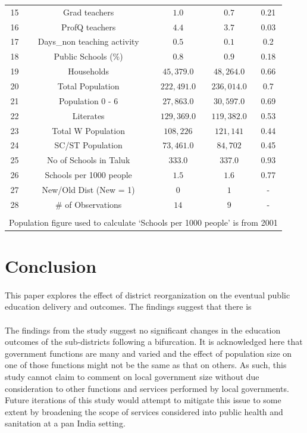 \documentclass[12pt, a4paper]{article}
\begin{document}
\begin{table}[!htbp]
\begin{tabular}{@{\extracolsep{5pt}} ccccc}
		15 & Grad teachers & $1.0$ & $0.7$ & 0.21 \\ 
		16 & ProfQ teachers & $4.4$ & $3.7$ & 0.03 \\ 
		17 & Days\_non teaching activity & $0.5$ & $0.1$ & 0.2 \\ 
		18 & Public Schools (\%) & $0.8$ & $0.9$ & 0.18 \\ 
		19 & Households & $45,379.0$ & $48,264.0$ & 0.66 \\ 
		20 & Total Population & $222,491.0$ & $236,014.0$ & 0.7 \\ 
		21 & Population 0 - 6 & $27,863.0$ & $30,597.0$ & 0.69 \\ 
		22 & Literates & $129,369.0$ & $119,382.0$ & 0.53 \\ 
		23 & Total W Population & $108,226$ & $121,141$ & 0.44 \\ 
		24 & SC/ST Population & $73,461.0$ & $84,702$ & 0.45 \\ 
		25 & No of Schools in Taluk & $333.0$ & $337.0$ & 0.93 \\ 
		26 & Schools per 1000 people & $1.5$ & $1.6$ & 0.77 \\ 
		27 & New/Old Dist (New = 1) & $0$ & $1$ & - \\ 
		28 & \# of Observations & $14$ & $9$ & - \\ 
		\hline \\[-1.8ex] 
		\multicolumn{5}{l}{Population figure used to calculate `Schools per 1000 people' is from 2001} \\ 
	\end{tabular} 
\end{table}

\section*{Conclusion}
\paragraph{} This paper explores the effect of district reorganization on the eventual public education delivery and outcomes. The findings suggest that there is 

\paragraph{} The findings from the study suggest no significant changes in the education outcomes of the sub-districts following a bifurcation. It is acknowledged here that government functions are many and varied and the effect of population size on one of those functions might not be the same as that on others. As such, this study cannot claim to comment on local government size without due consideration to other functions and services performed by local governments. Future iterations of this study would attempt to mitigate this issue to some extent by broadening the scope of services considered into public health and sanitation at a pan India setting.
\printbibliography
\pagebreak
\end{document}
